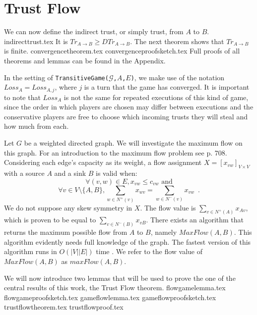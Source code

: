 \section{Trust Flow}
  We can now define the indirect trust, or simply trust, from $A$ to $B$.
  {indirecttrust.tex}
  \noindent It is $Tr_{A \rightarrow B} \geq DTr_{A \rightarrow B}$. The next theorem shows that
  $Tr_{A \rightarrow B}$ is finite.
  {convergencetheorem.tex}
  {convergenceproofsketch.tex}
  Full proofs of all theorems and lemmas can be found in the Appendix.

  In the setting of \texttt{TransitiveGame(}$\mathcal{G}$\texttt{,}$A$\texttt{,}$E$\texttt{)}, we make use of the notation
  $Loss_A = Loss_{A, j}$, where $j$ is a turn that the game has converged. It is important to note that $Loss_A$ is
  not the same for repeated executions of this kind of game, since the order in which players are chosen may differ between
  executions and the conservative players are free to choose which incoming trusts they will steal and how much from each.

  Let $G$ be a weighted directed graph. We will investigate the maximum flow on this graph. For an introduction to the
  maximum flow problem see \cite{clrs} p. 708. Considering each edge's capacity as its weight, a flow assignment
  $X = [x_{vw}]_{V \times V}$ with a source $A$ and a sink $B$ is valid when:
  \begin{equation}
  \label{flow1}
     \forall (v, w) \in E, x_{vw} \leq c_{vw} \mbox{ and}
  \end{equation}
  \begin{equation}
  \label{flow2}
     \forall v \in V \setminus \{A,B\}, \sum\limits_{w \in N^{+}(v)}x_{wv} = \sum\limits_{w \in N^{-}(v)}x_{vw}
     \enspace.
  \end{equation}
  We do not suppose any skew symmetry in $X$. The flow value is $\sum\limits_{v \in N^{+}\left(A\right)}x_{Av}$, which is
  proven to be equal to $\sum\limits_{v \in N^{-}\left(B\right)}x_{vB}$. There exists an algorithm that returns the maximum
  possible flow from $A$ to $B$, namely $MaxFlow\left(A, B\right)$. This algorithm evidently needs full knowledge of the
  graph. The fastest version of this algorithm runs in $O\left(|V||E|\right)$ time \cite{maxflownm}. We refer to the flow
  value of $MaxFlow\left(A, B\right)$ as $maxFlow\left(A, B\right)$.

  We will now introduce two lemmas that will be used to prove the one of the central results of this work, the Trust Flow
  theorem.
  {flowgamelemma.tex}
  {flowgameproofsketch.tex}
  {gameflowlemma.tex}
  {gameflowproofsketch.tex}
  {trustflowtheorem.tex}
  {trustflowproof.tex}


